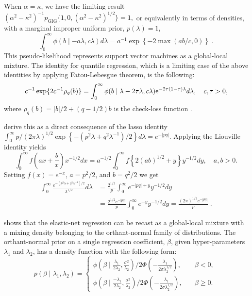 \documentclass[lineno]{biometrika}
\begin{document}
\begin{remark}
When $\alpha = \kappa$, we have the limiting result $(\alpha^2-\kappa^2)^{-1} p_{\mathrm{GIG}}\{1,0, (\alpha^2-\kappa^2)^{1/2} \} = 1,$
or equivalently in terms of densities, with a marginal improper uniform prior, $p(\lambda) = 1$,
\begin{equation}
  \int_{0}^{\infty} \phi(b \mid -a\lambda, c\lambda) d\lambda = a^{-1} \exp\left\{-2 \max(ab/c,0)\right\}
  \;. 
  \label{eq:svm}
\end{equation}
This pseudo-likelihood represents support vector machines as a global-local mixture. The identity for quantile regression, which is a limiting case of the above identities by applying Fatou-Lebesgue theorem, is the following: 
\[
c^{-1}\exp\{ 2c^{-1} \rho_q(b) \}= \int_{0}^{\infty} \phi( b \mid \lambda - 2\tau \lambda, c \lambda){\rm e}^{-2\tau(1-\tau)\lambda} d\lambda, \quad c, \tau > 0,
\]
where $\rho_q(b) = \rvert b \lvert / 2 + (q-1/2) b$ is the check-loss function \citep{polson_data_2013}.
\end{remark}

\citet{polson_data_2011} derive this as a direct consequence of the lasso identity $\int_0^{\infty} p/(2 \pi \lambda)^{1/2} \exp\left\{-\left(p^2 \lambda+q^2 \lambda^{-1}\right)/2\right\} d\lambda = e^{-\lvert pq \rvert}$. Applying the Liouville identity yields
\[
\int_{0}^{\infty} f\left(ax + \frac{b}{x} \right) x^{-1/2} dx = a^{-1/2} \int_{0}^{\infty} f\left\{ 2 (ab)^{1/2} + y \right\} y^{-1/2} dy, \quad a, b > 0.
\]
Setting $f(x) = e^{-x}$, $a = p^2/2$, and $b = q^2/2$ we get
\begin{align*}
  \int_0^{\infty} \frac{e^{-(p^2 \lambda + q^2 \lambda^{-1})/2}}{\lambda^{1/2}} d\lambda
  & = \frac{2^{1/2}}{p} \int_0^{\infty} e^{-|pq| + y} y^{-1/2} d y \\
  & = \frac{2^{1/2} e^{-|pq|}}{p} \int_0^{\infty} e^{-y} y^{-1/2} d y 
  = \frac{(2\pi)^{1/2} e^{-|pq|}}{p}
  \;.
\end{align*}

\citet{hans2011comment} shows that the elastic-net regression can be recast as a
global-local mixture with a mixing density belonging to the orthant-normal
family of distributions.  The orthant-normal prior on a single regression
coefficient, $\beta$, given hyper-parameters $\lambda_1$ and $\lambda_2$, 
has a density function with the following form:
\begin{equation}
  p(\beta \mid \lambda_1, \lambda_2)  = 
  \begin{cases} 
   \phi(\beta \mid \frac{\lambda_1}{2\lambda_2}, \frac{\sigma^2}{\lambda_2}) 
   / 2\Phi\left(-\frac{\lambda_1}{2\sigma \lambda_2^{1/2} }\right), & \quad \beta < 0, 
   \\
   \phi(\beta \mid \frac{-\lambda_1}{2\lambda_2}, \frac{\sigma^2}{\lambda_2}) / 
   2\Phi\left(-\frac{\lambda_1}{2\sigma \lambda_2^{1/2} }\right), & \quad \beta \geq 0.
  \end{cases} 
  \;
  \label{eq:hans}
\end{equation}
\end{document}
